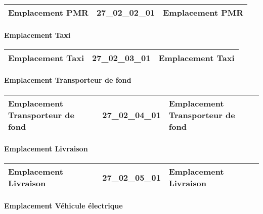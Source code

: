 \documentclass[12pt,titlepage,oneside]{book}
\begin{document}
\renewcommand{\arraystretch}{1.2}
\begin{supertabular}{|p{10cm}|c|p{15cm}|}
 Emplacement PMR & 27\_02\_02\_01 & Emplacement PMR\\
\hline
\end{supertabular}


\paragraph{Emplacement Taxi}
\noindent
\vspace{\baselineskip}

\renewcommand{\arraystretch}{1.2}
\begin{supertabular}{|p{10cm}|c|p{15cm}|}
 Emplacement Taxi & 27\_02\_03\_01 & Emplacement Taxi\\
\hline
\end{supertabular}


\paragraph{Emplacement Transporteur de fond}
\noindent
\vspace{\baselineskip}

\renewcommand{\arraystretch}{1.2}
\begin{supertabular}{|p{10cm}|c|p{15cm}|}
 Emplacement Transporteur de fond & 27\_02\_04\_01 & Emplacement Transporteur de fond\\
\hline
\end{supertabular}


\paragraph{Emplacement Livraison}
\noindent
\vspace{\baselineskip}

\renewcommand{\arraystretch}{1.2}
\begin{supertabular}{|p{10cm}|c|p{15cm}|}
 Emplacement Livraison & 27\_02\_05\_01 & Emplacement Livraison\\
\hline
\end{supertabular}


\paragraph{Emplacement Véhicule électrique}
\noindent
\vspace{\baselineskip}
\end{document}
